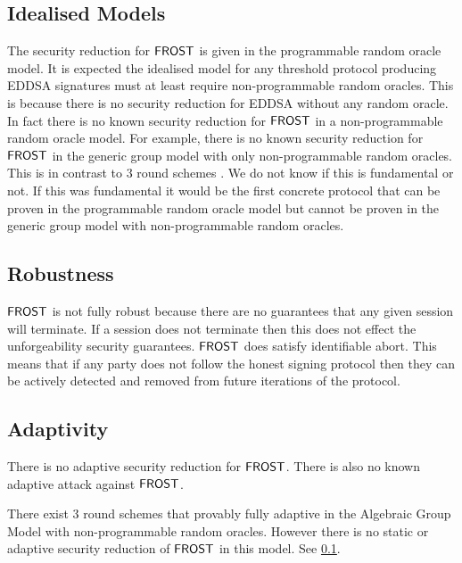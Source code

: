 \subsection{Idealised Models}\label{section:comparisons:idealised}
The security reduction for $\mathsf{FROST}$ is given in the programmable random oracle model.
It is expected the idealised model for any threshold protocol producing EDDSA signatures must at least require non-programmable random oracles.
This is because there is no security reduction for EDDSA without any random oracle. 
In fact there is no known security reduction for $\mathsf{FROST}$ in a non-programmable random oracle model.
For example, there is no known security reduction for $\mathsf{FROST}$ in the generic group model with only non-programmable random oracles.
This is in contrast to $3$ round schemes \cite{}.
We do not know if this is fundamental or not.
If this was fundamental it would be the first concrete protocol that can be proven in the programmable random oracle model but cannot be proven in the generic group model with non-programmable random oracles.

\subsection{Robustness}
$\mathsf{FROST}$ is not fully robust because there are no guarantees that any given session will terminate.
If a session does not terminate then this does not effect the unforgeability security guarantees.
$\mathsf{FROST}$ does satisfy identifiable abort.  This means that if any party does not follow the honest signing protocol then they can be actively detected and removed from future iterations of the protocol.


\subsection{Adaptivity}\label{section:comparisons:adaptive}
There is no adaptive security reduction for $\mathsf{FROST}$.
There is also no known adaptive attack against $\mathsf{FROST}$.

There exist $3$ round schemes that provably fully adaptive \cite{} in the Algebraic Group Model with non-programmable random oracles.  However there is no static or adaptive security reduction of $\mathsf{FROST}$ in this model.  See \cref{section:comparisons:idealised}.

